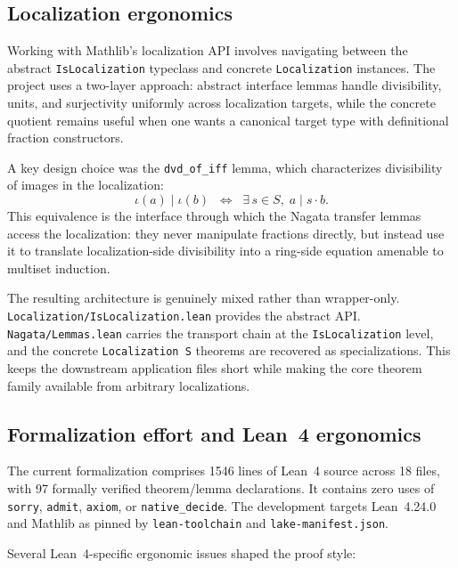 \documentclass[11pt]{article}
\theoremstyle{plain}
\theoremstyle{definition}
\theoremstyle{remark}
\newcommand{\li}[1]{\texorpdfstring{\texttt{#1}}{#1}}
\newcommand{\lf}[1]{\texorpdfstring{\nolinkurl{#1}}{#1}}
\begin{document}
\subsection{Localization ergonomics}

Working with Mathlib's localization API involves navigating between the abstract
\li{IsLocalization} typeclass and concrete \li{Localization} instances.  The
project uses a two-layer approach: abstract interface lemmas handle
divisibility, units, and surjectivity uniformly across localization targets,
while the concrete quotient remains useful when one wants a canonical target
type with definitional fraction constructors.

A key design choice was the \li{dvd\_of\_iff} lemma, which characterizes
divisibility of images in the localization:
\[
  \iota(a)\mid\iota(b)
  \;\;\Longleftrightarrow\;\;
  \exists\,s\in S,\;a\mid s\cdot b.
\]
This equivalence is the interface through which the Nagata transfer lemmas
access the localization: they never manipulate fractions directly, but instead
use it to translate localization-side divisibility into a ring-side equation
amenable to multiset induction.

The resulting architecture is genuinely mixed rather than wrapper-only.
\lf{Localization/IsLocalization.lean} provides the abstract API.
\lf{Nagata/Lemmas.lean} carries the transport chain at the
\li{IsLocalization} level, and the concrete \li{Localization\,S} theorems are
recovered as specializations.  This keeps the downstream application files
short while making the core theorem family available from arbitrary
localizations.

\subsection{Formalization effort and Lean~4 ergonomics}

The current formalization comprises 1546 lines of Lean~4 source across 18
files, with 97 formally verified theorem/lemma declarations.  It contains zero
uses of \li{sorry}, \li{admit}, \li{axiom}, or \li{native\_decide}.  The
development targets Lean~4.24.0 and Mathlib as pinned by
\lf{lean-toolchain} and \lf{lake-manifest.json}.

Several Lean~4-specific ergonomic issues shaped the proof style:
\end{document}
